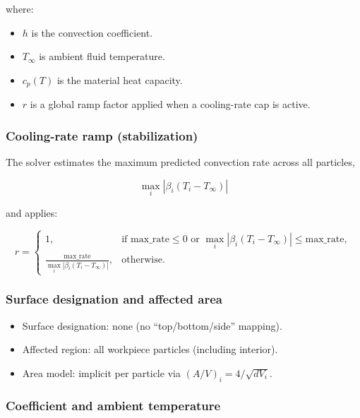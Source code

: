 \documentclass[11pt]{article}
\begin{document}
where:

\begin{itemize}
  \item $h$ is the convection coefficient.
  \item $T_\infty$ is ambient fluid temperature.
  \item $c_p(T)$ is the material heat capacity.
  \item $r$ is a global ramp factor applied when a cooling-rate cap is active.
\end{itemize}

\subsubsection{Cooling-rate ramp (stabilization)}

The solver estimates the maximum predicted convection rate across all particles,

\begin{equation}
\max_i \left|\beta_i (T_i - T_\infty)\right|
\end{equation}

and applies:

\begin{equation}
r=
\begin{cases}
1, & \text{if }\mathrm{max\_rate} \le 0 \text{ or } \max_i|\beta_i (T_i - T_\infty)| \le \mathrm{max\_rate}, \\
\frac{\mathrm{max\_rate}}{\max_i|\beta_i (T_i - T_\infty)|}, & \text{otherwise}.
\end{cases}
\end{equation}

\subsubsection{Surface designation and affected area}

\begin{itemize}
  \item Surface designation: none (no ``top/bottom/side'' mapping).
  \item Affected region: all workpiece particles (including interior).
  \item Area model: implicit per particle via $(A/V)_i = 4/\sqrt{dV_i}$.
\end{itemize}

\subsubsection{Coefficient and ambient temperature}
\end{document}
